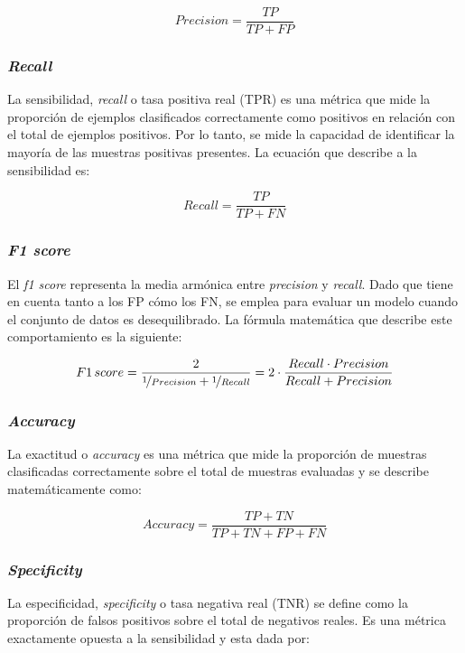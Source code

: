 \begin{equation}
	\label{eq:precision}
	Precision = \frac{TP}{TP + FP}
\end{equation}


\subsubsection{\emph{Recall}}
La sensibilidad, \emph{recall} o tasa positiva real (TPR) es una métrica que mide la proporción de ejemplos 
clasificados correctamente como positivos en relación con el total de ejemplos positivos. Por lo tanto, se 
mide la capacidad de identificar la mayoría de las muestras positivas presentes. La ecuación que describe 
a la sensibilidad es:

\begin{equation}
	\label{eq:recall}
	Recall = \frac{TP}{TP + FN}
\end{equation}


\subsubsection{\emph{F1 score}}
El \emph{f1 score} representa la media armónica entre \emph{precision} y \emph{recall}. Dado que tiene 
en cuenta tanto a los FP cómo los FN, se emplea para evaluar un modelo cuando el conjunto de datos es 
desequilibrado. La fórmula matemática que describe este comportamiento es la siguiente:

\begin{equation}
	\label{eq:f1score}
	F1\,score = \frac{2}{\nicefrac{1}{Precision} + \nicefrac{1}{Recall}} = 2\cdot\frac{Recall \cdot Precision}{Recall + Precision}
\end{equation}

\subsubsection{\emph{Accuracy}}
La exactitud o \emph{accuracy} es una métrica que mide la proporción de muestras clasificadas correctamente 
sobre el total de muestras evaluadas y se describe matemáticamente como:

\begin{equation}
	\label{eq:accuracy}
	Accuracy = \frac{TP + TN}{TP + TN + FP + FN}
\end{equation}

\subsubsection{\emph{Specificity}}
La especificidad, \emph{specificity} o tasa negativa real (TNR) se define como la proporción de falsos positivos 
sobre el total de negativos reales. Es una métrica exactamente opuesta a la sensibilidad y esta dada por:

